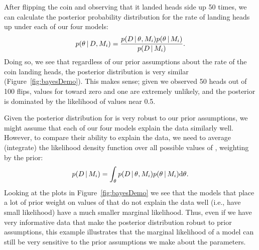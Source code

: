 \begin{linenomath}
After flipping the coin and observing that it landed heads side up 50 times, we
can calculate the posterior probability distribution for the rate of landing
heads up under each of our four models:
\begin{equation}
    p(\probheads \given \flipdata, \coinmodel[i]) = \frac{
        p(\flipdata \given \probheads, \coinmodel[i]) p(\probheads \given \coinmodel[i])
    }{
        p(\flipdata \given \coinmodel[i])
    }.
    \label{eq:coinBayesRule}
\end{equation}
Doing so, we see that regardless of our prior assumptions about the rate of the
coin landing heads, the posterior distribution is very similar
(Figure~\ref{fig:bayesDemo}).
This makes sense; given we observed 50 heads out of 100 flips, values for
\probheads toward zero and one are extremely unlikely, and the posterior is
dominated by the likelihood of values near 0.5.
\end{linenomath}

\begin{linenomath}
Given the posterior distribution for \probheads is very robust to our prior
assumptions, we might assume that each of our four models explain the data
similarly well.
However, to compare their ability to explain the data, we need to
average (integrate) the likelihood density function over all possible
values of \probheads, weighting by the prior:
\begin{equation}
    p(\data \given \model[i]) =
    \int_{\probheads}
    p( \data \given \probheads, \model[i])
    p(\probheads \given \model[i])
    \diff{\probheads}.
    \label{eq:coinMarginalLikelihood}
\end{equation}
Looking at the plots in Figure~\ref{fig:bayesDemo} we see that the models that
place a lot of prior weight on values of \probheads that do not explain the
data well (i.e., have small likelihood) have a much smaller marginal likelihood.
Thus, even if we have very informative data that make the posterior
distribution robust to prior assumptions, this example illustrates that the
marginal likelihood of a model can still be very sensitive to the prior
assumptions we make about the parameters.
\end{linenomath}


